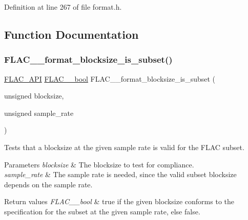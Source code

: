 Definition at line 267 of file format.\+h.



\subsection{Function Documentation}
\mbox{\label{group__flac__format_gacc6258efc7b737f90ee0c32bdb6775ba}} 
\subsubsection{\texorpdfstring{FLAC\_\_format\_blocksize\_is\_subset()}{FLAC\_\_format\_blocksize\_is\_subset()}}
{\footnotesize\ttfamily \mbox{\hyperlink{group__flac__export_ga56ca07df8a23310707732b1c0007d6f5}{F\+L\+A\+C\+\_\+\+A\+PI}} \mbox{\hyperlink{ordinals_8h_a95103469f1cbd78b8cf250194985b34e}{F\+L\+A\+C\+\_\+\+\_\+bool}} F\+L\+A\+C\+\_\+\+\_\+format\+\_\+blocksize\+\_\+is\+\_\+subset (\begin{DoxyParamCaption}\item[{unsigned}]{blocksize,  }\item[{unsigned}]{sample\+\_\+rate }\end{DoxyParamCaption})}

Tests that a blocksize at the given sample rate is valid for the F\+L\+AC subset.


\begin{DoxyParams}{Parameters}
{\em blocksize} & The blocksize to test for compliance. \\
\hline
{\em sample\+\_\+rate} & The sample rate is needed, since the valid subset blocksize depends on the sample rate. \\
\hline
\end{DoxyParams}

\begin{DoxyRetVals}{Return values}
{\em F\+L\+A\+C\+\_\+\+\_\+bool} & {\ttfamily true} if the given blocksize conforms to the specification for the subset at the given sample rate, else {\ttfamily false}. \\
\hline
\end{DoxyRetVals}
\mbox{\label{group__flac__format_gae922cabe2dc3f81af10cb635cf996114}} 
